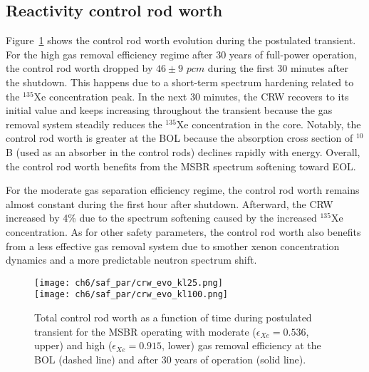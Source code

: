 \subsection{Reactivity control rod worth}
Figure~\ref{fig:lf-msbr-crw-evo} shows the control rod worth evolution 
during the postulated transient. For the high gas removal efficiency regime 
after 30 years of full-power operation, the control rod worth dropped by 
$46\pm9$ $pcm$ during the first 30 minutes after the shutdown. This happens 
due to a short-term spectrum hardening related to the $^{135}$Xe concentration 
peak. In the next 30 minutes, the CRW recovers to its initial value and keeps 
increasing throughout the transient because the gas removal system steadily 
reduces the $^{135}$Xe concentration in the core. Notably, the control rod 
worth is greater at the \gls{BOL} because the absorption cross section of 
$^{10}$B (used as an absorber in the control rods) declines rapidly with 
energy. Overall, the control rod worth benefits from the \gls{MSBR} spectrum 
softening toward \gls{EOL}.

For the moderate gas separation efficiency regime, the control rod worth 
remains almost constant during the first hour after shutdown. Afterward, the 
CRW increased by 4\% due to the spectrum softening caused by the increased 
$^{135}$Xe concentration. As for other safety parameters, the control rod 
worth also benefits from a less effective gas removal system due to smother 
xenon concentration dynamics and a more predictable neutron spectrum shift. 
\begin{figure}[htbp!] %
	\centering
	\texttt{[image: ch6/saf\_par/crw\_evo\_kl25.png]}\\
	\vspace{-10mm}
	\hspace{+0.05mm}
	\texttt{[image: ch6/saf\_par/crw\_evo\_kl100.png]}
	\vspace{-3mm}
	\caption{Total control rod worth as a function of time during 
		postulated transient
for the \gls{MSBR} operating with moderate 
		($\epsilon_{Xe}=0.536$, upper) and high ($\epsilon_{Xe}=0.915$, lower) 
		gas removal efficiency at the \gls{BOL} (dashed line) and after 30 
		years of operation (solid line).}
	\label{fig:lf-msbr-crw-evo}
\end{figure}

